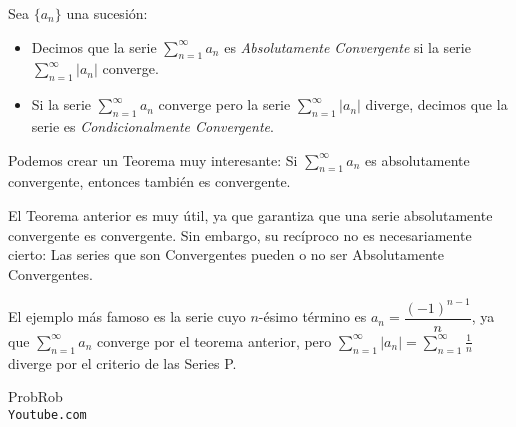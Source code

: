 \documentclass[12pt]{report}							    %
\begin{document}
        Sea $\{a_n\}$ una sucesión:

        \begin{itemize}
            \item Decimos que la serie $\sum_{n=1}^{\infty} a_n$ es \emph{Absolutamente Convergente} si la serie $\sum_{n=1}^{\infty} |a_n|$ converge.

            \item Si la serie $\sum_{n=1}^{\infty} a_n$ converge pero la serie $\sum_{n=1}^{\infty} |a_n|$ diverge, decimos que la serie es \emph{Condicionalmente Convergente}.
        \end{itemize}

        Podemos crear un Teorema muy interesante:
        Si $\sum_{n=1}^{\infty} a_n$ es absolutamente convergente, entonces también es convergente.

        El Teorema anterior es muy útil, ya que garantiza que una serie absolutamente convergente es convergente.
        Sin embargo, su recíproco no es necesariamente cierto: Las series que son Convergentes pueden o no ser Absolutamente Convergentes. 

        El ejemplo más famoso es la serie cuyo $n$-ésimo término es $a_n=\dfrac{(-1)^{n-1}}{n}$, ya que $\sum_{n=1}^{\infty}a_n$ converge por el teorema anterior, pero $\sum_{n=1}^{\infty} |a_n| = \sum_{n=1}^{\infty} \frac{1}{n}$ diverge por el criterio de las Series P.



\clearpage

	\begin{thebibliography}{9}

		ProbRob
		\\\texttt{Youtube.com}


	 

\end{thebibliography}
\end{document}
